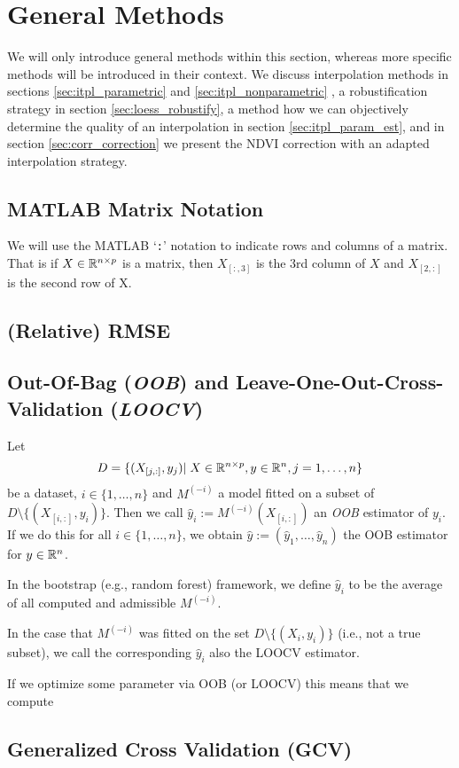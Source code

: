 \section{General Methods}{
	We will only introduce general methods within this section, whereas more specific methods will be introduced in their context. We discuss interpolation methods in sections \ref{sec:itpl_parametric} and \ref{sec:itpl_nonparametric} , a robustification strategy in section \ref{sec:loess_robustify}, a method how we can objectively determine the quality of an interpolation in section \ref{sec:itpl_param_est}, and in section \ref{sec:corr_correction} we present the NDVI correction with an adapted interpolation strategy.

	\subsection{MATLAB Matrix Notation}{ \label{sec:MATLAB}
		We will use the MATLAB `\texttt{:}' notation to indicate rows and columns of a matrix. That is if $X\in\mathbb{R}^{n\times p}$ is a matrix, then $X_{[:,3]}$ is the $3$rd column of $X$ and $X_{[2,:]}$ is the second row of X. 

	}

	\subsection{(Relative) RMSE}

	\subsection{Out-Of-Bag (\textit{OOB}) and Leave-One-Out-Cross-Validation (\textit{LOOCV})}{
		\label{sec:OOB_LOOCV}
		Let 
		$$
			D=\{(X_{[j,:]},y_j)|\; X\in\mathbb{R}^{n\times p}, y\in \mathbb{R}^n, j=1,\dots,n\}
		$$
		be a dataset, $i\in \{1,\dots,n\}$ and $M^{(-i)}$ a model fitted on a subset of $D\setminus\{(X_{[i,:]},y_i)\}$. Then we call $\hat y_i:= M^{(-i)}(X_{[i,:]})$ an \textit{OOB} estimator of $y_i$. If we do this for all $i\in\{1,\dots,n\}$, we obtain $\hat y := \left(\hat y_1,\dots,\hat y_n\right)$ the OOB estimator for $y\in \mathbb{R}^n$.

		In the bootstrap (e.g., random forest) framework, we define $\hat y_i$ to be the average of all computed and admissible $M^{(-i)}$. 
		
		In the case that $M^{(-i)}$ was fitted on the set $D\setminus\{(X_i,y_i)\}$ (i.e., not a true subset), we call the corresponding $\hat y_i$ also the LOOCV estimator.	

		If we optimize some parameter via OOB (or LOOCV) this means that we compute 
	}

	\subsection{Generalized Cross Validation (GCV)}{

	}
}

